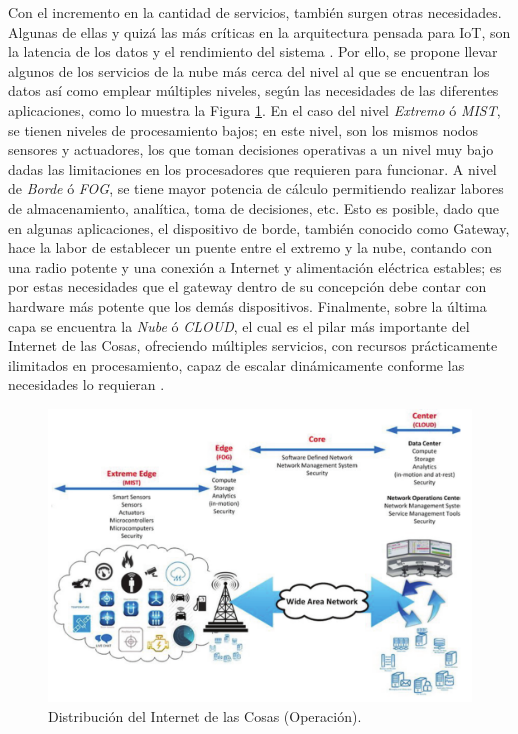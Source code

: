 Con el incremento en la cantidad de servicios, también surgen otras necesidades. Algunas de ellas y quizá las más críticas en la arquitectura pensada para IoT, son la latencia de los datos y el rendimiento del sistema \cite{bonomi2012fog}. Por ello, se propone llevar algunos de los servicios de la nube más cerca del nivel al que se encuentran los datos así como emplear múltiples niveles, según las necesidades de las diferentes aplicaciones, como lo muestra la Figura \ref{fig:IoTDist}. En el caso del nivel \textit{Extremo} ó \textit{MIST}, se tienen niveles de procesamiento bajos; en este nivel, son los mismos nodos sensores y actuadores, los que toman decisiones operativas a un nivel muy bajo dadas las limitaciones en los procesadores que requieren para funcionar. A nivel de \textit{Borde} ó \textit{FOG}, se tiene mayor potencia de cálculo permitiendo realizar labores de almacenamiento, analítica, toma de decisiones, etc. Esto es posible, dado que en algunas aplicaciones, el dispositivo de borde, también conocido como Gateway, hace la labor de establecer un puente entre el extremo y la nube, contando con una radio potente y una conexión a Internet y alimentación eléctrica estables; es por estas necesidades que el gateway dentro de su concepción debe contar con hardware más potente que los demás dispositivos. Finalmente, sobre la última capa se encuentra la \textit{Nube} ó \textit{CLOUD}, el cual es el pilar más importante del Internet de las Cosas, ofreciendo múltiples servicios, con recursos prácticamente ilimitados en procesamiento, capaz de escalar dinámicamente conforme las necesidades lo requieran \cite{bonomi2014fog}.

\begin{figure}[!ht]
	\centering
		\includegraphics[scale=0.5]{Figures/IoTDist}
	\caption{Distribución del Internet de las Cosas (Operación)\cite{bonomi2012fog}.}
	\label{fig:IoTDist}
\end{figure}

